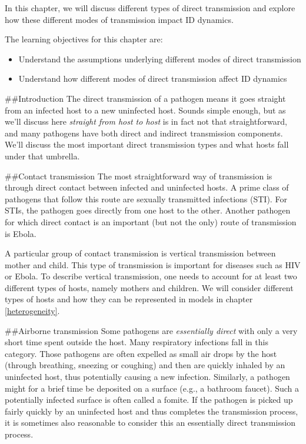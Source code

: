 \documentclass[]{book}
\providecommand{\tightlist}{%
  \setlength{\itemsep}{0pt}\setlength{\parskip}{0pt}}
\theoremstyle{definition}
\theoremstyle{definition}
\theoremstyle{definition}
\theoremstyle{remark}
\begin{document}
In this chapter, we will discuss different types of direct transmission
and explore how these different modes of transmission impact ID
dynamics.

The learning objectives for this chapter are:

\begin{itemize}
\tightlist
\item
  Understand the assumptions underlying different modes of direct
  transmission
\item
  Understand how different modes of direct transmission affect ID
  dynamics
\end{itemize}

\#\#Introduction The direct transmission of a pathogen means it goes
straight from an infected host to a new uninfected host. Sounds simple
enough, but as we'll discuss here \emph{straight from host to host} is
in fact not that straightforward, and many pathogens have both direct
and indirect transmission components. We'll discuss the most important
direct transmission types and what hosts fall under that umbrella.

\#\#Contact transmission The most straightforward way of transmission is
through direct contact between infected and uninfected hosts. A prime
class of pathogens that follow this route are sexually transmitted
infections (STI). For STIs, the pathogen goes directly from one host to
the other. Another pathogen for which direct contact is an important
(but not the only) route of transmission is Ebola.

A particular group of contact transmission is vertical transmission
between mother and child. This type of transmission is important for
diseases such as HIV or Ebola. To describe vertical transmission, one
needs to account for at least two different types of hosts, namely
mothers and children. We will consider different types of hosts and how
they can be represented in models in chapter \ref{heterogeneity}.

\#\#Airborne transmission Some pathogens are \emph{essentially direct}
with only a very short time spent outside the host. Many respiratory
infections fall in this category. Those pathogens are often expelled as
small air drops by the host (through breathing, sneezing or coughing)
and then are quickly inhaled by an uninfected host, thus potentially
causing a new infection. Similarly, a pathogen might for a brief time be
deposited on a surface (e.g., a bathroom faucet). Such a potentially
infected surface is often called a fomite. If the pathogen is picked up
fairly quickly by an uninfected host and thus completes the transmission
process, it is sometimes also reasonable to consider this an essentially
direct transmission process.
\end{document}
